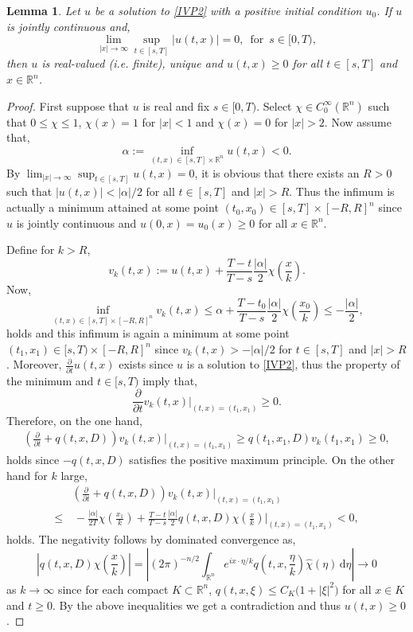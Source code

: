 \documentclass[a4paper, 12pt]{report}
\newtheorem{lemma}[theorem]{Lemma}
\theoremstyle{cor}
\theoremstyle{remark}
\theoremstyle{definition}
\begin{document}
\begin{lemma}\label{TDSSoAPL1}
Let $u$ be a solution to \eqref{IVP2} with a positive initial condition $u_0$.  If $u$ is jointly continuous and,
$$
\lim_{|x| \to \infty}\sup_{t \in [s, T]}|u(t, x)| = 0, \,\,\, \text{for} \,\,\, s \in [0, T),
$$
then $u$ is real-valued (i.e. finite), unique and $u(t, x) \ge 0$ for all $t \in [s, T]$ and $x \in \mathbb{R}^n$.
\end{lemma}
\begin{proof}
First suppose that $u$ is real and fix $s \in [0, T)$.  Select $\chi \in C_0^\infty(\mathbb{R}^n)$ such that $0 \le \chi \le 1$, $\chi(x) = 1$ for $|x| < 1$ and $\chi(x) = 0$ for $|x| > 2$.  Now assume that,
$$
\alpha := \inf_{(t, x) \in [s, T] \times \mathbb{R}^n}u(t, x) < 0.
$$
By $\lim_{|x| \to \infty}\sup_{t \in [s, T]}u(t, x) = 0$, it is obvious that there exists an $R > 0$ such that $|u(t, x)| < |\alpha|/2$ for all $t \in [s, T]$ and $|x| > R$.  Thus the infimum is actually a minimum attained at some point $(t_0, x_0) \in [s, T] \times [-R, R]^n$ since $u$ is jointly continuous and $u(0, x) = u_0(x) \ge 0$ for all $x \in \mathbb{R}^n$.

Define for $k > R$,
$$
v_k(t, x) := u(t, x) + \frac{T - t}{T - s}\frac{|\alpha|}{2}\chi\left(\frac{x}{k}\right).
$$
Now,
$$
\inf_{(t, x) \in [s, T] \times [-R, R]^n}v_k(t, x) \le \alpha + \frac{T - t_0}{T - s}\frac{|\alpha|}{2}\chi\left(\frac{x_0}{k}\right) \le -\frac{|\alpha|}{2},
$$
holds and this infimum is again a minimum at some point $(t_1, x_1) \in [s, T) \times [-R, R]^n$ since $v_k(t, x) > -|\alpha|/2$ for $t \in [s, T]$ and $|x| > R$.  Moreover, $\frac{\partial}{\partial t}u(t, x)$ exists since $u$ is a solution to \eqref{IVP2}, thus the property of the minimum and $t \in [s, T)$ imply that,
$$
\frac{\partial}{\partial t}v_k(t, x)\bigg|_{(t, x) = (t_1, x_1)} \ge 0.
$$
Therefore, on the one hand,
$$
\begin{aligned}
\left(\frac{\partial}{\partial t} + q(t, x, D)\right)v_k(t, x)\bigg|_{(t, x) = (t_1, x_1)} \ge q(t_1, x_1, D)v_k(t_1, x_1) \ge 0,
\end{aligned}
$$
holds since $-q(t, x, D)$ satisfies the positive maximum principle.  On the other hand for $k$ large,
$$
\begin{aligned}
& \left(\frac{\partial}{\partial t} + q(t, x, D)\right)v_k(t, x)\bigg|_{(t, x) = (t_1, x_1)}\\
\le & \, -\frac{|\alpha|}{2T}\chi\left(\frac{x_1}{k}\right) + \frac{T - t}{T - s}\frac{|\alpha|}{2}q(t, x, D)\chi\left(\frac{x}{k}\right)\bigg|_{(t, x) = (t_1, x_1)} < 0,
\end{aligned}
$$
holds.  The negativity follows by dominated convergence as,
$$
\left|q(t, x, D)\chi\left(\frac{x}{k}\right)\right| = \left|(2\pi)^{-n/2}\int_{\mathbb{R}^n}e^{ix\cdot\eta/k}q\left(t, x, \frac{\eta}{k}\right)\hat{\chi}(\eta)\,\mathrm{d}\eta\right| \to 0
$$
as $k \to \infty$ since for each compact $K \subset \mathbb{R}^n$, $q(t, x, \xi) \le C_K\big(1 + |\xi|^2\big)$ for all $x \in K$ and $t \ge 0$.  By the above inequalities we get a contradiction and thus $u(t, x) \ge 0$.


\end{proof}
\end{document}
